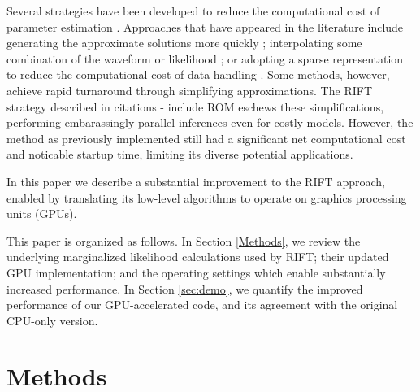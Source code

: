 \documentclass[twocolumn,prd,nofootinbib]{revtex4}
\newcommand\editremark[1]{{\color{red} #1}}
\begin{document}
Several strategies have been
developed to reduce the 
computational cost of parameter estimation \cite{gwastro-pe-Brandon-STF2,gwastro-PE-AlternativeArchitectures,gw-astro-ReducedOrderQuadraturePE-TiglioEtAl2014,2016PhRvD..94d4031S,2017arXiv170302062V}.  
Approaches that have appeared in the literature include
generating the approximate solutions more quickly \cite{gwastro-mergers-PE-ReducedOrder-2013,2014PhRvX...4c1006F,2013PhRvD..87l2002S,2013PhRvD..87d4008C,gwastro-mergers-IMRPhenomP,gwastro-SpinTaylorF2-2013}; 
interpolating some combination
of the waveform or likelihood \cite{gwastro-approx-ROMNR-Blackman2015,2013PhRvD..87d4008C,2013PhRvD..87l2002S,2014CQGra..31s5010P,2014PhRvD..90d4074S,gwastro-PE-AlternativeArchitectures,cole2014likelihood,2012MNRAS.421..169G};  or 
adopting a sparse representation to reduce the computational cost of data
handling \cite{antil2013two,gwastro-mergers-PE-ReducedOrder-2013,2016PhRvD..94d4031S,gw-astro-ReducedOrderQuadraturePE-TiglioEtAl2014,gwastro-PE-AlternativeArchitectures}.   %
 Some methods, however, achieve rapid turnaround through simplifying approximations.  
%
The RIFT strategy described in \editremark{citations - include ROM} eschews these simplifications, performing
embarassingly-parallel inferences even for costly models.   However, the method as previously implemented still had a
significant net  computational cost and noticable startup time, limiting its diverse potential applications.

In this paper we describe a substantial improvement to the RIFT approach, enabled by translating its low-level
algorithms to operate on graphics processing units (GPUs).


This paper is organized as follows.
In Section \ref{Methods}, we review the underlying marginalized likelihood calculations used by RIFT; their updated GPU
implementation; and the operating settings which enable substantially increased performance.
In Section \ref{sec:demo}, we quantify the improved performance of our  GPU-accelerated code, and its agreement with the
original CPU-only version.


\section{Methods}
\end{document}
